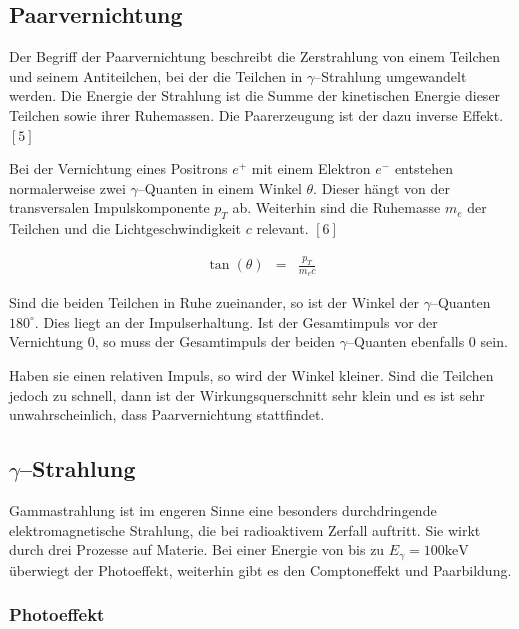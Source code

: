 \documentclass[12pt,a4paper]{scrartcl}
\numberwithin{equation}{section} %
\newcommand{\pu}[1]{\ensuremath{\mathrm{#1}}}
\begin{document}
\hypertarget{paarvernichtung}{%
\subsection{Paarvernichtung}\label{paarvernichtung}}

Der Begriff der Paarvernichtung beschreibt die Zerstrahlung von einem Teilchen und seinem Antiteilchen, bei der die Teilchen in $\gamma$--Strahlung umgewandelt werden. Die Energie der Strahlung ist die Summe der kinetischen Energie dieser Teilchen sowie ihrer Ruhemassen. Die Paarerzeugung ist der dazu inverse Effekt. $[5]$

Bei der Vernichtung eines Positrons $e^+$ mit einem Elektron $e^-$ entstehen normalerweise zwei $\gamma$--Quanten in einem Winkel $\theta$. Dieser hängt von der transversalen Impulskomponente $p_T$ ab. Weiterhin sind die Ruhemasse $m_e$ der Teilchen und die Lichtgeschwindigkeit $c$ relevant. $[6]$

\begin{eqnarray}
    \tan(\theta) &=& \frac{p_T}{m_ec}
\end{eqnarray}

\noindent
Sind die beiden Teilchen in Ruhe zueinander, so ist der Winkel der $\gamma$--Quanten $\pu{180^\circ}$. Dies liegt an der Impulserhaltung. Ist der Gesamtimpuls vor der Vernichtung $0$, so muss der Gesamtimpuls der beiden $\gamma$--Quanten ebenfalls $0$ sein.

Haben sie einen relativen Impuls, so wird der Winkel kleiner. Sind die Teilchen jedoch zu schnell, dann ist der Wirkungsquerschnitt sehr klein und es ist sehr unwahrscheinlich, dass Paarvernichtung stattfindet.

\hypertarget{gammastrahlung}{%
\subsection{\texorpdfstring{$\gamma$--Strahlung}{\textbackslash gamma--Strahlung}}\label{gammastrahlung}}

Gammastrahlung ist im engeren Sinne eine besonders durchdringende elektromagnetische Strahlung, die bei radioaktivem Zerfall auftritt. Sie wirkt durch drei Prozesse auf Materie. Bei einer Energie von bis zu $E_\gamma = \pu{100 keV}$ überwiegt der Photoeffekt, weiterhin gibt es den Comptoneffekt und Paarbildung.

\hypertarget{photoeffekt}{%
\subsubsection{Photoeffekt}\label{photoeffekt}}
\end{document}
